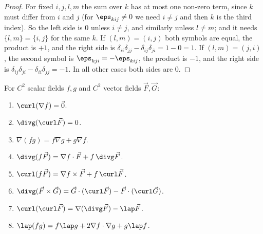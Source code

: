\begin{proof}
For fixed $i,j,l,m$ the sum over $k$ has at most one non-zero term, since $k$ must differ from $i$ and $j$ (for $\eps_{kij}\ne0$ we need $i\ne j$ and then $k$ is the third index). So the left side is $0$ unless $i\ne j$, and similarly unless $l\ne m$; and it needs $\{l,m\}=\{i,j\}$ for the same $k$. If $(l,m)=(i,j)$ both symbols are equal, the product is $+1$, and the right side is $\delta_{ii}\delta_{jj}-\delta_{ij}\delta_{ji}=1-0=1$. If $(l,m)=(j,i)$, the second symbol is $\eps_{kji}=-\eps_{kij}$, the product is $-1$, and the right side is $\delta_{ij}\delta_{ji}-\delta_{ii}\delta_{jj}=-1$. In all other cases both sides are $0$.
\end{proof}

\begin{theorem}\label{thm:identities}
For $C^2$ scalar fields $f,g$ and $C^2$ vector fields $\vec F,\vec G$:
\begin{enumerate}[label=(\arabic*)]
  \item $\curl(\nabla f)=\vec 0$.
  \item $\divg(\curl\vec F)=0$.
  \item $\nabla(fg)=f\nabla g+g\nabla f$.
  \item $\divg(f\vec F)=\nabla f\cdot\vec F+f\,\divg\vec F$.
  \item $\curl(f\vec F)=\nabla f\times\vec F+f\,\curl\vec F$.
  \item $\divg(\vec F\times\vec G)=\vec G\cdot(\curl\vec F)-\vec F\cdot(\curl\vec G)$.
  \item $\curl(\curl\vec F)=\nabla(\divg\vec F)-\lap\vec F$.
  \item $\lap(fg)=f\lap g+2\nabla f\cdot\nabla g+g\lap f$.
\end{enumerate}
\end{theorem}

